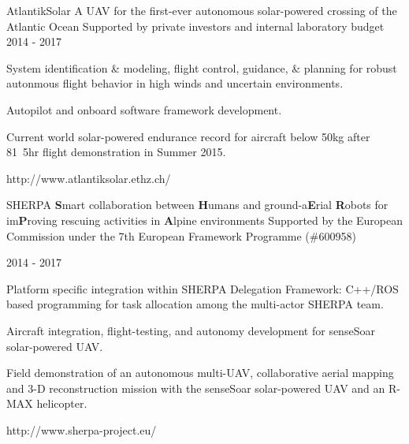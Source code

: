 \begin{cventries}
\cvprojwideentry
  	{AtlantikSolar} %
  	{A UAV for the first-ever autonomous solar-powered crossing of the Atlantic Ocean} %
    {Supported by private investors and internal laboratory budget} %
    {2014 - 2017} %
    {
      \begin{cvitems} %
        \item {System identification \& modeling, flight control, guidance, \& planning for robust autonmous flight behavior in high winds and uncertain environments.}
        \item {Autopilot and onboard software framework development.}
        \item {Current world solar-powered endurance record for aircraft below \unit{50}{kg} after \unit{81.5}{hr} flight demonstration in Summer 2015.}
      \end{cvitems}
    } %
    {http://www.atlantiksolar.ethz.ch/} %
    {\showprojectdescriptions}

\cvprojwideentry
  	{SHERPA} %
  	{\textbf{S}mart collaboration between \textbf{H}umans and ground-a\textbf{E}rial \textbf{R}obots for im\textbf{P}roving rescuing activities in \textbf{A}lpine environments} %
    {Supported by the European Commission under the 7th European Framework Programme (\#600958)} %
    {\parbox{\linewidth}{\raggedright 2014 - 2017\linebreak}} %
    {
      \begin{cvitems} %
        \item {Platform specific integration within SHERPA Delegation Framework: C++/ROS based programming for task allocation among the multi-actor SHERPA team.}
        \item {Aircraft integration, flight-testing, and autonomy development for senseSoar solar-powered UAV.}
        \item {Field demonstration of an autonomous multi-UAV, collaborative aerial mapping and 3-D reconstruction mission with the senseSoar solar-powered UAV and an R-MAX helicopter.}
      \end{cvitems}
    } %
    {http://www.sherpa-project.eu/} %
    {\showprojectdescriptions}


\end{cventries}
